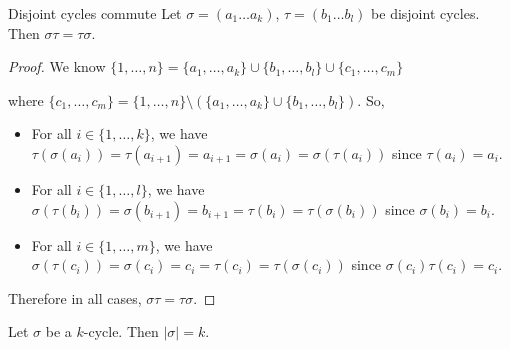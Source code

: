 \documentclass[12pt]{article}
\begin{document}
	\begin{mythm}{Disjoint cycles commute}{}
		Let $\sigma=(a_1\dots a_k)$, $\tau=(b_1\dots b_l)$ be disjoint cycles. Then $\sigma\tau=\tau\sigma$.
		\begin{proof}
			We know $\{1, \dots, n\}=\{a_1, \dots, a_k\}\cup\{b_1, \dots, b_l\}\cup\{c_1, \dots, c_m\}$
			
			where $\{c_1, \dots, c_m\}=\{1, \dots, n\}\setminus(\{a_1, \dots, a_k\}\cup\{b_1, \dots, b_l\})$. So,
			\begin{itemize}
				\item For all $i\in\{1, \dots, k\}$, we have $\tau(\sigma(a_i))=\tau(a_{i+1})=a_{i+1}=\sigma(a_i)=\sigma(\tau(a_i))$ since $\tau(a_i)=a_i$.
				\item For all $i\in\{1, \dots, l\}$, we have $\sigma(\tau(b_i))=\sigma(b_{i+1})=b_{i+1}=\tau(b_i)=\tau(\sigma(b_i))$ since $\sigma(b_i)=b_i$.
				\item For all $i\in\{1, \dots, m\}$, we have $\sigma(\tau(c_i))=\sigma(c_i)=c_i=\tau(c_i)=\tau(\sigma(c_i))$ since $\sigma(c_i)\tau(c_i)=c_i$.
			\end{itemize}
			 Therefore in all cases, $\sigma\tau=\tau\sigma$.
		\end{proof}
	\end{mythm}
	
	\begin{myrem}{}{}
		Let $\sigma$ be a $k$-cycle. Then $|\sigma|=k$.
	\end{myrem}
	
\end{document}
